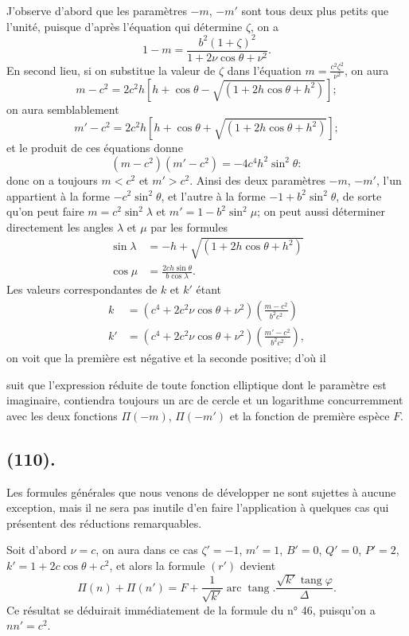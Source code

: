 \documentclass{article}
\begin{document}
J'observe d'abord que les paramètres $-m$, $-m'$ sont tous deux plus petits que l'unité, puisque d'après l'équation qui détermine $\zeta$, on a
\[ 1-m=\frac{b^{2}(1+\zeta)^{2}}{1+2\nu\cos\theta+\nu^{2}}. \]
En second lieu, si on substitue la valeur de $\zeta$ dans l'équation $m=\frac{c^{2}\zeta^{2}}{\nu^{2}}$, on aura
\[ m-c^{2}=2c^{2}h[h+\cos\theta-\sqrt{(1+2h\cos\theta+h^{2})}]; \]
on aura semblablement
\[ m'-c^{2}=2c^{2}h[h+\cos\theta+\sqrt{(1+2h\cos\theta+h^{2})}]; \]
et le produit de ces équations donne
\[ (m-c^{2})(m'-c^{2})=-4c^{4}h^{2}\sin^{2}\theta: \]
donc on a toujours $m<c^{2}$ et $m'>c^{2}$. Ainsi des deux paramètres $-m$, $-m'$, l'un appartient à la forme $-c^{2}\sin^{2}\theta$, et l'autre à la forme $-1+b^{2}\sin^{2}\theta$, de sorte qu'on peut faire $m=c^{2}\sin^{2}\lambda$ et $m'=1-b^{2}\sin^{2}\mu$; on peut aussi déterminer directement les angles $\lambda$ et $\mu$ par les formules
\[ \begin{aligned} \sin\lambda&=-h+\sqrt{(1+2h\cos\theta+h^{2})}\\ \cos\mu&=\frac{2ch\sin\theta}{b\cos\lambda}. \end{aligned} \]
Les valeurs correspondantes de $k$ et $k'$ étant
\[ \begin{aligned} k&=(c^{4}+2c^{2}\nu\cos\theta+\nu^{2})\left(\frac{m-c^{2}}{b^{2}c^{2}}\right)\\ k'&=(c^{4}+2c^{2}\nu\cos\theta+\nu^{2})\left(\frac{m'-c^{2}}{b^{2}c^{2}}\right), \end{aligned} \]
on voit que la première est négative et la seconde positive; d'où il

suit que l'expression réduite de toute fonction elliptique dont le paramètre est imaginaire, contiendra toujours un arc de cercle et un logarithme concurremment avec les deux fonctions $\Pi(-m)$, $\Pi(-m')$ et la fonction de première espèce $F$.

\subsection*{(110).}

Les formules générales que nous venons de développer ne sont sujettes à aucune exception, mais il ne sera pas inutile d'en faire l'application à quelques cas qui présentent des réductions remarquables.

Soit d'abord $\nu=c$, on aura dans ce cas $\zeta'=-1$, $m'=1$, $B'=0$, $Q'=0$, $P'=2$, $k'=1+2c\cos\theta+c^{2}$, et alors la formule $(r')$ devient
\[ \Pi(n)+\Pi(n')=F+\frac{1}{\sqrt{k'}}\operatorname{arc}\operatorname{tang}.\frac{\sqrt{k'}\operatorname{tang}\varphi}{\Delta}. \]
Ce résultat se déduirait immédiatement de la formule du n° 46, puisqu'on a $nn'=c^{2}$.
\end{document}
